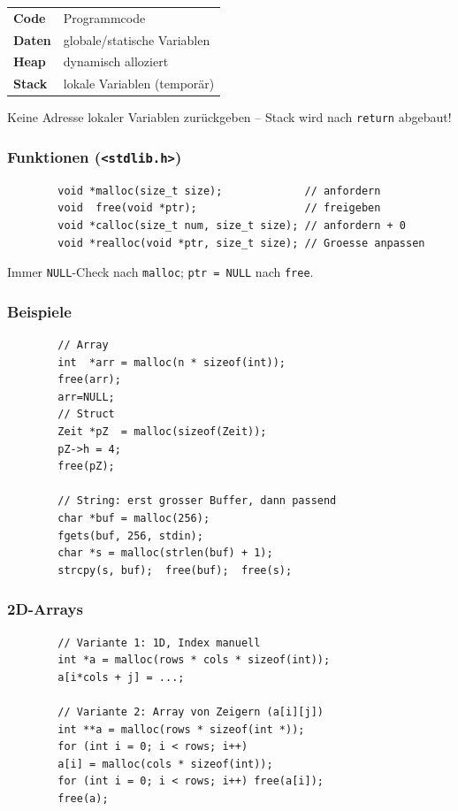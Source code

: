 \documentclass[a4paper,9pt]{article}
\begin{document}
	\begin{tabular}{ll}
		\textbf{Code}  & Programmcode \\
		\textbf{Daten} & globale/statische Variablen \\
		\textbf{Heap}  & dynamisch alloziert \\
		\textbf{Stack} & lokale Variablen (temporär) \\
	\end{tabular}
	
	\begin{tcolorbox}
		Keine Adresse lokaler Variablen zurückgeben -- Stack wird nach \texttt{return} abgebaut!
	\end{tcolorbox}
	
	\subsubsection{Funktionen (\texttt{<stdlib.h>})}
	\begin{lstlisting}
		void *malloc(size_t size);             // anfordern
		void  free(void *ptr);                 // freigeben
		void *calloc(size_t num, size_t size); // anfordern + 0
		void *realloc(void *ptr, size_t size); // Groesse anpassen
	\end{lstlisting}
	Immer \texttt{NULL}-Check nach \texttt{malloc}; \texttt{ptr = NULL} nach \texttt{free}.
	
	\subsubsection{Beispiele}
	\begin{lstlisting}
		// Array
		int  *arr = malloc(n * sizeof(int));   
		free(arr); 
		arr=NULL;
		// Struct
		Zeit *pZ  = malloc(sizeof(Zeit));      
		pZ->h = 4; 
		free(pZ);
		
		// String: erst grosser Buffer, dann passend
		char *buf = malloc(256);
		fgets(buf, 256, stdin);
		char *s = malloc(strlen(buf) + 1);
		strcpy(s, buf);  free(buf);  free(s);
	\end{lstlisting}
	
	\subsubsection{2D-Arrays}
	\begin{lstlisting}
		// Variante 1: 1D, Index manuell
		int *a = malloc(rows * cols * sizeof(int));
		a[i*cols + j] = ...;
		
		// Variante 2: Array von Zeigern (a[i][j])
		int **a = malloc(rows * sizeof(int *));
		for (int i = 0; i < rows; i++)
		a[i] = malloc(cols * sizeof(int));
		for (int i = 0; i < rows; i++) free(a[i]);
		free(a);
	\end{lstlisting}
	
\end{document}
